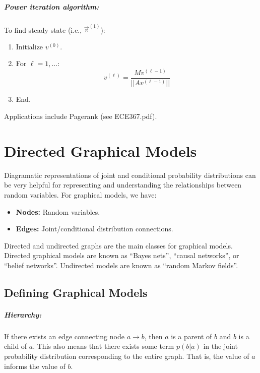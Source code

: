 \documentclass[a4paper,12pt]{report}
\begin{document}
\paragraph{Power iteration algorithm: } To find steady state (i.e., $\vec v^{(1)}$): 

\begin{enumerate}
\item Initialize $v^{(0)}$.
\item For $\ell = 1, \dots$:
\begin{equation}
v^{(\ell)} = \frac{Mv^{(\ell-1)}}{||Av^{(\ell-1)}||} 
\end{equation}
\item End.
\end{enumerate}

Applications include Pagerank (see ECE367.pdf).




\chapter{Directed Graphical Models}

Diagramatic representations of joint and conditional probability distributions can be very helpful for representing and understanding the relationships between random variables. For graphical models, we have:
\begin{itemize}
\item \textbf{Nodes:} Random variables.
\item \textbf{Edges:} Joint/conditional distribution connections.
\end{itemize}

Directed and undirected graphs are the main classes for graphical models. Directed graphical models are known as ``Bayes nets'', ``causal networks'', or ``belief networks''. Undirected models are known as ``random Markov fields''.


\section{Defining Graphical Models}

\paragraph{Hierarchy: } If there exists an edge connecting node $a\to b$, then $a$ is a parent of $b$ and $b$ is a child of $a$. This also means that there exists some term $p(b|a)$ in the joint probability distribution corresponding to the entire graph. That is, the value of $a$ informs the value of $b$.
\end{document}
